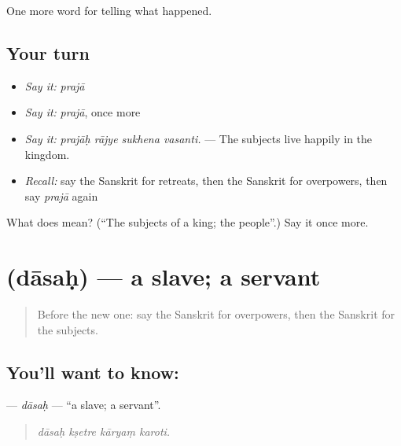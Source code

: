 \begin{grammarlens}[title={What you've built}]
One more word for telling what happened.
\end{grammarlens}

\subsection*{Your turn}
\begin{itemize}
\raggedright
  \item \emph{Say it:} \emph{prajā}
  \item \emph{Say it:} \emph{prajā}, once more
  \item \emph{Say it:} \emph{prajāḥ rājye sukhena vasanti.} — The subjects live happily in the kingdom.
  \item \emph{Recall:} say the Sanskrit for retreats, then the Sanskrit for overpowers, then say \emph{prajā} again
\end{itemize}

\begin{tcolorbox}[breakable,colback=teal!4,colframe=teal!35!black,title={Before you move on}]
What does  mean? (\textquotedblleft{}The subjects of a king; the people\textquotedblright{}.) Say it once more.
\end{tcolorbox}
\section[\texorpdfstring{\sk{दासः} (dāsaḥ)}{दासः (dāsaḥ)}]{ (dāsaḥ) — a slave; a servant}

\label{lesson:SA-C320-dasah}



\begin{quote}
Before the new one: say the Sanskrit for overpowers, then the Sanskrit for the subjects.
\end{quote}

\subsection*{You'll want to know: }
\textbf{} — \emph{dāsaḥ} — \textquotedblleft{}a slave; a servant\textquotedblright{}.

\begin{quote}
   
\end{quote}

\begin{quote}
\emph{dāsaḥ kṣetre kāryaṃ karoti.}
\end{quote}

